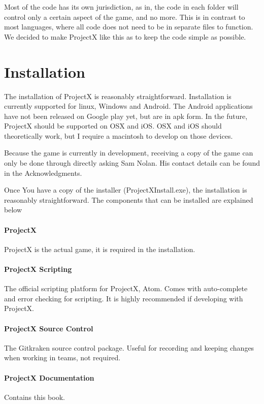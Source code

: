 \documentclass{book}
\begin{document}
	Most of the code has its own jurisdiction, as in, the code in each folder will control only a certain aspect of the game, and no more. This is in contrast to most languages, where all code does not need to be in separate files to function. We decided to make ProjectX like this as to keep the code simple as possible.
	
	\section{Installation}
	The installation of ProjectX is reasonably straightforward. Installation is currently supported for linux, Windows and Android. The Android applications have not been released on Google play yet, but are in apk form. In the future, ProjectX should be supported on OSX and iOS. OSX and iOS should theoretically work, but I require a macintosh to develop on those devices.
	
	Because the game is currently in development, receiving a copy of the game can only be done through directly asking Sam Nolan. His contact details can be found in the Acknowledgments.  
	
	Once You have a copy of the installer (ProjectXInstall.exe), the installation is reasonably straightforward. The components that can be installed are explained below
	
	\paragraph{ProjectX}
	ProjectX is the actual game, it is required in the installation.
	
	\paragraph{ProjectX Scripting}
	The official scripting platform for ProjectX, Atom. Comes with auto-complete and error checking for scripting. It is highly recommended if developing with ProjectX.
	
	\paragraph{ProjectX Source Control}
	The Gitkraken source control package. Useful for recording and keeping changes when working in teams, not required.
	
	\paragraph{ProjectX Documentation}
	Contains this book.
	
\end{document}
